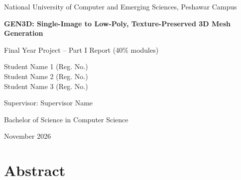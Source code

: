 \documentclass[12pt,a4paper]{report}
\newcommand{\projecttitle}{GEN3D: Single-Image to Low-Poly, Texture-Preserved 3D Mesh Generation}
\newcommand{\studentA}{Student Name 1 (Reg. No.)}
\newcommand{\studentB}{Student Name 2 (Reg. No.)}
\newcommand{\studentC}{Student Name 3 (Reg. No.)}
\newcommand{\supervisor}{Supervisor Name}
\newcommand{\degree}{Bachelor of Science in Computer Science}
\newcommand{\university}{National University of Computer and Emerging Sciences, Peshawar Campus}
\newcommand{\reportdate}{November 2026}
\begin{document}
\begin{titlepage}
  \centering
  {\large \university\par}
  \vspace{2.5cm}
  {\LARGE\bfseries \projecttitle\par}
  \vspace{1cm}
  {\large Final Year Project -- Part I Report (40\% modules)\par}
  \vspace{2cm}
  {\large \studentA\\ \studentB\\ \studentC\par}
  \vspace{1.5cm}
  {\large Supervisor: \supervisor\par}
  \vfill
  {\large \degree\par}
  \vspace{0.5cm}
  {\large \reportdate\par}
\end{titlepage}


\chapter*{Abstract}


\tableofcontents
\listoffigures
\listoftables

\clearpage
{}












\end{document}

